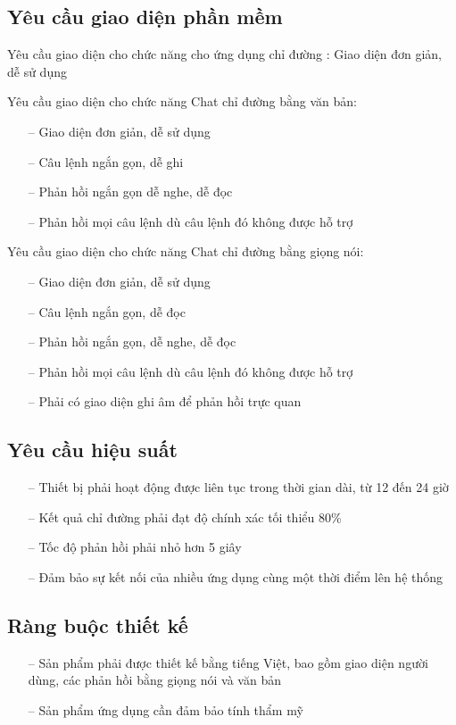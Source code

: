 \subsection{Yêu cầu giao diện phần mềm}

Yêu cầu giao diện cho chức năng cho ứng dụng chỉ đường : Giao diện đơn giản, dễ sử dụng

Yêu cầu giao diện cho chức năng Chat chỉ đường bằng văn bản:
\begin{itemize}
    \item[--] Giao diện đơn giản, dễ sử dụng
    \item[--] Câu lệnh ngắn gọn, dễ ghi
    \item[--] Phản hồi ngắn gọn dễ nghe, dễ đọc
    \item[--] Phản hồi mọi câu lệnh dù câu lệnh đó không được hỗ trợ
\end{itemize}

Yêu cầu giao diện cho chức năng Chat chỉ đường bằng giọng nói:
\begin{itemize}
    \item[--] Giao diện đơn giản, dễ sử dụng
    \item[--] Câu lệnh ngắn gọn, dễ đọc
    \item[--] Phản hồi ngắn gọn, dễ nghe, dễ đọc
    \item[--] Phản hồi mọi câu lệnh dù câu lệnh đó không được hỗ trợ
    \item[--] Phải có giao diện ghi âm để phản hồi trực quan
\end{itemize}

\subsection{Yêu cầu hiệu suất}
\begin{itemize}
    \item[--] Thiết bị phải hoạt động được liên tục trong thời gian dài, từ 12 đến 24 giờ
    \item[--] Kết quả chỉ đường phải đạt độ chính xác tối thiểu 80\%
    \item[--] Tốc độ phản hồi phải nhỏ hơn 5 giây
    \item[--] Đảm bảo sự kết nối của nhiều ứng dụng cùng một thời điểm lên hệ thống
\end{itemize}

\subsection{Ràng buộc thiết kế}
\begin{itemize}
    \item[--] Sản phẩm phải được thiết kế bằng tiếng Việt, bao gồm giao diện người dùng, các phản hồi bằng giọng nói và văn bản
    \item[--] Sản phẩm ứng dụng cần đảm bảo tính thẩm mỹ
\end{itemize}

